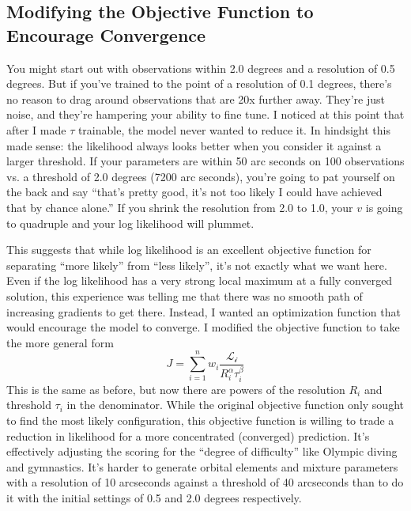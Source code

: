 \subsection{Modifying the Objective Function to Encourage Convergence}
You might start out with observations within 2.0 degrees and a resolution of 0.5 degrees.
But if you've trained to the point of a resolution of 0.1 degrees, there's no reason to drag around observations that are 20x further away.
They're just noise, and they're hampering your ability to fine tune.
I noticed at this point that after I made $\tau$ trainable, the model never wanted to reduce it.
In hindsight this made sense: the likelihood always looks better when you consider it against a larger threshold.
If your parameters are within 50 arc seconds on 100 observations vs. a threshold of 2.0 degrees (7200 arc seconds), 
you're going to pat yourself on the back and say ``that's pretty good, it's not too likely I could have achieved that by chance alone.''
If you shrink the resolution from 2.0 to 1.0, your $v$ is going to quadruple and your log likelihood will plummet.

This suggests that while log likelihood is an excellent objective function for separating ``more likely'' from ``less likely'', it's not exactly what we want here.
Even if the log likelihood has a very strong local maximum at a fully converged solution,
this experience was telling me that there was no smooth path of increasing gradients to get there.
Instead, I wanted an optimization function that would encourage the model to converge.
I modified the objective function to take the more general form
$$J = \sum_{i=1}^{n} w_i \frac{\mathcal{L_i}}{R_i^\alpha \tau_i^\beta}$$
This is the same as before, but now there are powers of the resolution $R_i$ and threshold $\tau_i$ in the denominator.
While the original objective function only sought to find the most likely configuration,
this objective function is willing to trade a reduction in likelihood for a more concentrated (converged) prediction.
It's effectively adjusting the scoring for the ``degree of difficulty'' like Olympic diving and gymnastics.
It's harder to generate orbital elements and mixture parameters with a resolution of 10 arcseconds against a threshold of 40 arcseconds
than to do it with the initial settings of 0.5 and 2.0 degrees respectively.

